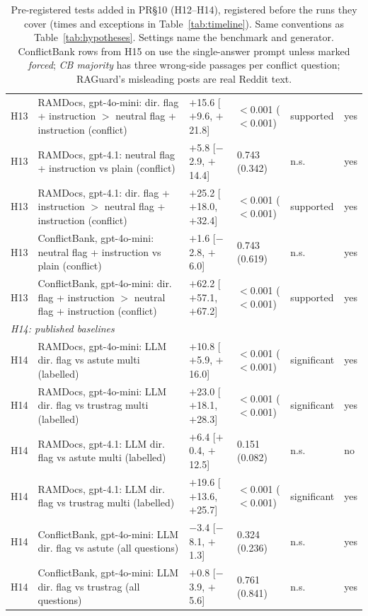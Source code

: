 \begin{table}[p]
{\begin{tabular}{lp{6.6cm}llll}
H13 & RAMDocs, gpt-4o-mini: dir. flag + instruction $>$ neutral flag + instruction (conflict) & $+$15.6 [$+$9.6, $+$21.8] & $<$0.001 ($<$0.001) & supported & yes \\
H13 & RAMDocs, gpt-4.1: neutral flag + instruction vs plain (conflict) & $+$5.8 [$-$2.9, $+$14.4] & 0.743 (0.342) & n.s. & yes \\
H13 & RAMDocs, gpt-4.1: dir. flag + instruction $>$ neutral flag + instruction (conflict) & $+$25.2 [$+$18.0, $+$32.4] & $<$0.001 ($<$0.001) & supported & yes \\
H13 & ConflictBank, gpt-4o-mini: neutral flag + instruction vs plain (conflict) & $+$1.6 [$-$2.8, $+$6.0] & 0.743 (0.619) & n.s. & yes \\
H13 & ConflictBank, gpt-4o-mini: dir. flag + instruction $>$ neutral flag + instruction (conflict) & $+$62.2 [$+$57.1, $+$67.2] & $<$0.001 ($<$0.001) & supported & yes \\
\multicolumn{6}{l}{\emph{H14: published baselines}} \\
H14 & RAMDocs, gpt-4o-mini: LLM dir. flag vs astute multi (labelled) & $+$10.8 [$+$5.9, $+$16.0] & $<$0.001 ($<$0.001) & significant & yes \\
H14 & RAMDocs, gpt-4o-mini: LLM dir. flag vs trustrag multi (labelled) & $+$23.0 [$+$18.1, $+$28.3] & $<$0.001 ($<$0.001) & significant & yes \\
H14 & RAMDocs, gpt-4.1: LLM dir. flag vs astute multi (labelled) & $+$6.4 [$+$0.4, $+$12.5] & 0.151 (0.082) & n.s. & no \\
H14 & RAMDocs, gpt-4.1: LLM dir. flag vs trustrag multi (labelled) & $+$19.6 [$+$13.6, $+$25.7] & $<$0.001 ($<$0.001) & significant & yes \\
H14 & ConflictBank, gpt-4o-mini: LLM dir. flag vs astute (all questions) & $-$3.4 [$-$8.1, $+$1.3] & 0.324 (0.236) & n.s. & yes \\
H14 & ConflictBank, gpt-4o-mini: LLM dir. flag vs trustrag (all questions) & $+$0.8 [$-$3.9, $+$5.6] & 0.761 (0.841) & n.s. & yes \\
\bottomrule
\end{tabular}}
\caption{Pre-registered tests added in PR\S10 (H12--H14), registered before the runs they cover (times and exceptions in
Table~\ref{tab:timeline}). Same conventions as
Table~\ref{tab:hypotheses}. Settings name the benchmark and generator. ConflictBank rows from H15 on use the
single-answer prompt unless marked \emph{forced}; \emph{CB majority} has three wrong-side passages per conflict
question; RAGuard's misleading posts are real Reddit text.}
\label{tab:hypotheses3}
\end{table}

